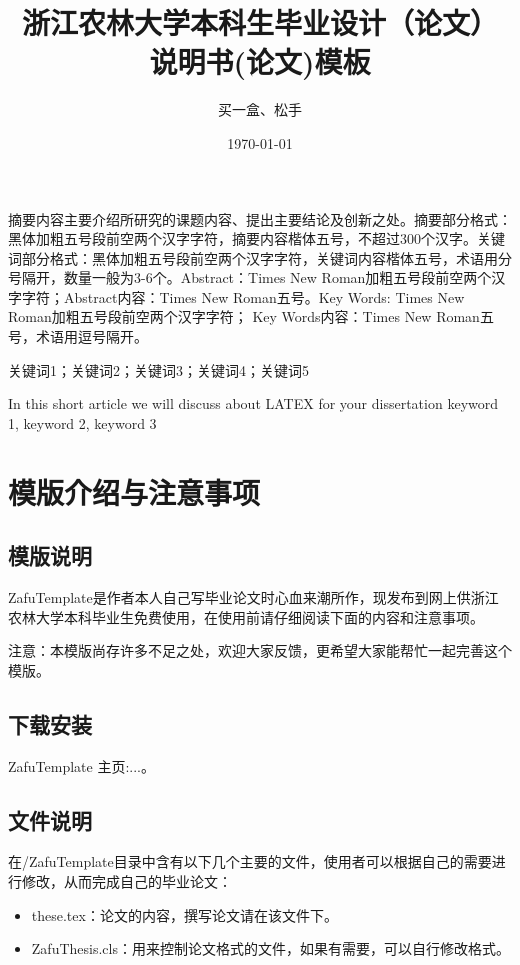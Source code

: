 \documentclass[AutoFakeBold]{ZafuThesis}
\author{买一盒、松手}%
\date{\today}%
\title{{浙江农林大学本科生毕业设计（论文） }{说明书(论文)模板}}%
\begin{document}
\customCover

\makestatement

\customContent

\frontmatter
\ZhAbstract
{
  摘要内容主要介绍所研究的课题内容、提出主要结论及创新之处。摘要部分格式：黑体加粗五号段前空两个汉字字符，摘要内容楷体五号，不超过300个汉字。关键词部分格式：黑体加粗五号段前空两个汉字字符，关键词内容楷体五号，术语用分号隔开，数量一般为3-6个。Abstract：Times New Roman加粗五号段前空两个汉字字符；Abstract内容：Times New Roman五号。Key Words: Times New Roman加粗五号段前空两个汉字字符； Key Words内容：Times New Roman五号，术语用逗号隔开。
  
}
{关键词1；关键词2；关键词3；关键词4；关键词5}


\EnAbstract
{In this short article we will discuss about LATEX for your dissertation}
{keyword 1, keyword 2, keyword 3}



\mainmatter
\section{模版介绍与注意事项}
\subsection{模版说明}
ZafuTemplate是作者本人自己写毕业论文时心血来潮所作，现发布到网上供浙江农林大学本科毕业生免费使用，在使用前请仔细阅读下面的内容和注意事项。\par
注意：本模版尚存许多不足之处，欢迎大家反馈，更希望大家能帮忙一起完善这个模版。
\subsection{下载安装}
ZafuTemplate 主页:...。
\subsection{文件说明}
在/ZafuTemplate目录中含有以下几个主要的文件，使用者可以根据自己的需要进行修改，从而完成自己的毕业论文：
\begin{itemize}
  \item these.tex：论文的内容，撰写论文请在该文件下。
  \item ZafuThesis.cls：用来控制论文格式的文件，如果有需要，可以自行修改格式。
\end{itemize}
\end{document}
